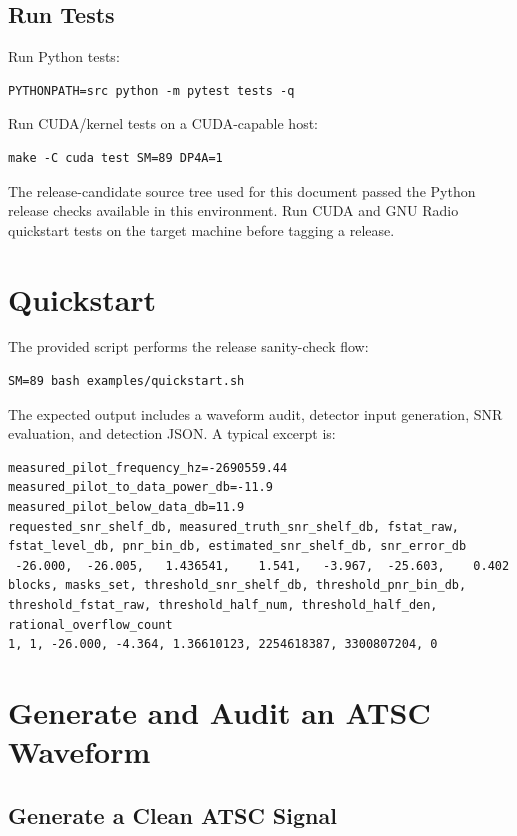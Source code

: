 \documentclass[10pt,letterpaper]{article}
\begin{document}
\subsection{Run Tests}

Run Python tests:
\begin{lstlisting}[style=shell]
PYTHONPATH=src python -m pytest tests -q
\end{lstlisting}
Run CUDA/kernel tests on a CUDA-capable host:
\begin{lstlisting}[style=shell]
make -C cuda test SM=89 DP4A=1
\end{lstlisting}
The release-candidate source tree used for this document passed the Python release checks available in this environment.  Run CUDA and GNU Radio quickstart tests on the target machine before tagging a release.

\section{Quickstart}

The provided script performs the release sanity-check flow:
\begin{lstlisting}[style=shell]
SM=89 bash examples/quickstart.sh
\end{lstlisting}
The expected output includes a waveform audit, detector input generation, SNR evaluation, and detection JSON.  A typical excerpt is:
\begin{lstlisting}[style=shell]
measured_pilot_frequency_hz=-2690559.44
measured_pilot_to_data_power_db=-11.9
measured_pilot_below_data_db=11.9
requested_snr_shelf_db, measured_truth_snr_shelf_db, fstat_raw, fstat_level_db, pnr_bin_db, estimated_snr_shelf_db, snr_error_db
 -26.000,  -26.005,   1.436541,    1.541,   -3.967,  -25.603,    0.402
blocks, masks_set, threshold_snr_shelf_db, threshold_pnr_bin_db, threshold_fstat_raw, threshold_half_num, threshold_half_den, rational_overflow_count
1, 1, -26.000, -4.364, 1.36610123, 2254618387, 3300807204, 0
\end{lstlisting}

\section{Generate and Audit an ATSC Waveform}

\subsection{Generate a Clean ATSC Signal}
\end{document}
